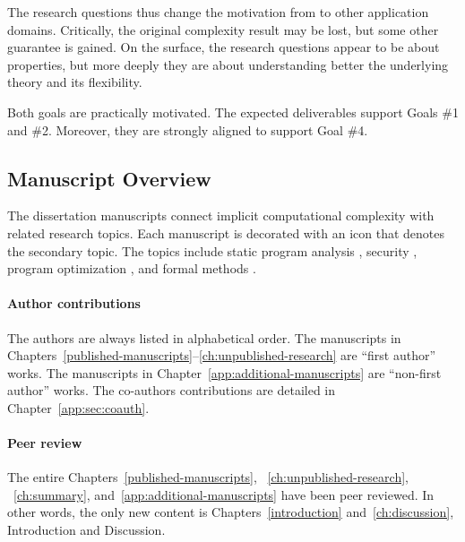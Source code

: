 The research questions thus change the motivation from 
to other application domains. Critically, the original complexity result may be
lost, but some other guarantee is gained. On the surface, the research questions
appear to be about properties, but more deeply they are about understanding
better the underlying theory and its flexibility.

Both goals are practically motivated. The expected deliverables support Goals
\#1 and \#2. Moreover, they are strongly aligned to support Goal \#4.

\subsection{Manuscript Overview}
\label{ssec:manuscripts}

The dissertation manuscripts connect implicit computational complexity with
related research topics. Each manuscript is decorated with an icon that denotes
the secondary topic. The topics include static program analysis \iconSPA,
security \iconSEC, program optimization \iconOPT, and formal methods \iconFM.


\paragraph*{Author contributions}
The authors are always listed in alphabetical order. The manuscripts in
Chapters~\autoref{published-manuscripts}--\autoref{ch:unpublished-research} are
\enquote{first author} works. The manuscripts in
Chapter~\autoref{app:additional-manuscripts} are \enquote{non-first author}
works. The co-authors contributions are detailed in
Chapter~\autoref{app:sec:coauth}.

\paragraph*{Peer review}
The entire Chapters~\autoref{published-manuscripts},
~\autoref{ch:unpublished-research}, ~\autoref{ch:summary},
and~\autoref{app:additional-manuscripts} have been peer reviewed. In other
words, the only new content is Chapters~\autoref{introduction}
and~\autoref{ch:discussion}, \ie Introduction and Discussion.

